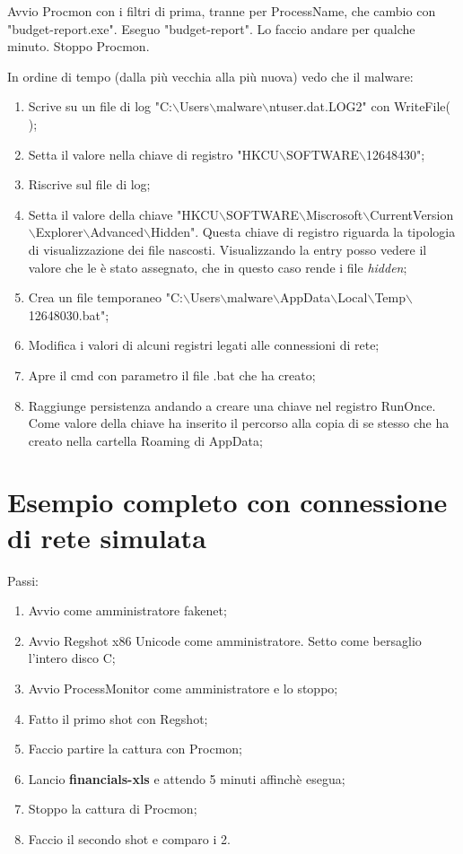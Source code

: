 \documentclass[a4paper]{book}
\begin{document}
Avvio Procmon con  i filtri di prima, tranne per ProcessName, che cambio con "budget-report.exe". Eseguo "budget-report". Lo faccio andare per qualche minuto. Stoppo Procmon. 

In ordine di tempo (dalla più vecchia alla più nuova) vedo che il malware:
\begin{enumerate}
    \item Scrive su un file di log "C:$\backslash$Users$\backslash$malware$\backslash$ntuser.dat.LOG2" con WriteFile( );
    \item Setta il valore nella chiave di registro "HKCU$\backslash$SOFTWARE$\backslash$12648430";
    \item Riscrive sul file di log;
    \item Setta il valore della chiave "HKCU$\backslash$SOFTWARE$\backslash$Miscrosoft$\backslash$CurrentVersion$\backslash$Explorer$\backslash$Advanced$\backslash$Hidden". Questa chiave di registro riguarda la tipologia di visualizzazione dei file nascosti. Visualizzando la entry posso vedere il valore che le è stato assegnato, che in questo caso rende i file \textit{hidden};
    \item Crea un file temporaneo "C:$\backslash$Users$\backslash$malware$\backslash$AppData$\backslash$Local$\backslash$Temp$\backslash$12648030.bat";
    \item Modifica i valori di alcuni registri legati alle connessioni di rete;
    \item Apre il cmd con parametro il file .bat che ha creato;
    \item Raggiunge persistenza andando a creare una chiave nel registro RunOnce. Come valore della chiave ha inserito il percorso alla copia di se stesso che ha creato nella cartella Roaming di AppData;
\end{enumerate}

\section{Esempio completo con connessione di rete simulata}
Passi:
\begin{enumerate}
    \item Avvio come amministratore fakenet;
    \item Avvio Regshot x86 Unicode come amministratore. Setto come bersaglio l'intero disco C;
    \item Avvio ProcessMonitor come amministratore e lo stoppo;
    \item Fatto il primo shot con Regshot;
    \item Faccio partire la cattura con Procmon;
    \item Lancio \textbf{financials-xls} e attendo 5 minuti affinchè esegua;
    \item Stoppo la cattura di Procmon;
    \item Faccio il secondo shot e comparo i 2.
\end{enumerate}
\end{document}
